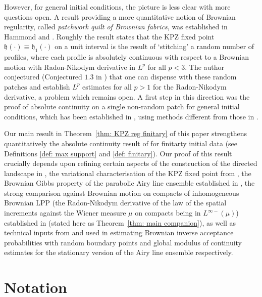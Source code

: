 \documentclass[11pt, reqno]{amsart}
\numberwithin{equation}{section}
\begin{document}
However, for general initial conditions, the picture is less clear with more questions open. A result providing a more quantitative notion of Brownian regularity, called \emph{patchwork quilt of Brownian fabrics}, was established in Hammond \cite{hammond2019patchwork} and \cite{hammond2019patchwork}. Roughly the result states that the KPZ fixed point $\mathfrak{h}(\cdot)\equiv \mathfrak{h}_1(\cdot)$ on a unit interval is the result of `stitching' a random number of profiles, where each profile is absolutely continuous with respect to a Brownian motion with Radon-Nikodym derivative in $L^p$ for all $p<3$. The author conjectured (Conjectured $1.3$ in \cite{hammond2019patchwork}) that one can dispense with these random patches and establish $L^p$ estimates for all $p>1$ for the Radon-Nikodym derivative, a problem which remains open. A first step in this direction was the proof of absolute continuity on a single non-random patch for general initial conditions, which has been established in \cite[Theorem~1.2]{sarkar2021brownian}, using methods different from those in \cite{hammond2019patchwork}.

Our main result in Theorem~\ref{thm: KPZ reg finitary} of this paper strengthens quantitatively the absolute continuity result of \cite{sarkar2021brownian} for finitarty initial data (see Definitions \ref{def: max support} and \ref{def: finitary}). Our proof of this result crucially depends upon refining certain aspects of the construction of the directed landscape in \cite{DOV}, the variational characterisation of the KPZ fixed point from \cite{sarkar2021brownian}, the Brownian Gibbs property of the parabolic Airy line ensemble established in \cite{corwin2014brownian}, the strong comparison against Brownian motion on compacts of inhomogeneous Brownian LPP (the Radon-Nikodym derivative of the law of the spatial increments against the Wiener measure $\mu$ on compacts being in $L^{\infty-}(\mu)$) established in \cite{tassopoulos2025inhomogeneousbrownian} (stated here as Theorem~\ref{thm: main companion}), as well as technical inputs from \cite{dauvergne2021} and \cite{wu2025applicationsoptimaltransportdyson} used in estimating Brownian inverse acceptance probabilities with random boundary points and global modulus of continuity estimates for the stationary version of the Airy line ensemble respectively. 

\section{Notation}\label{sec: notation}
\end{document}
